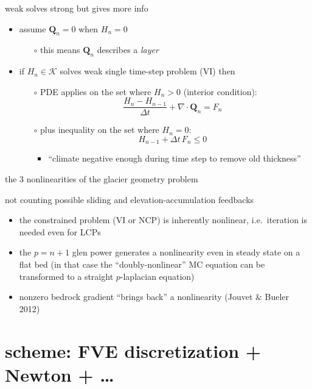 \documentclass{beamer}
\newcommand\bQ{\mathbf{Q}}
\newcommand\Div{\nabla\cdot}
\begin{document}
\begin{frame}{weak solves strong but gives more info}

\begin{itemize}
  \item assume $\bQ_n=0$ when $H_n=0$
    \begin{itemize}
    \item[$\circ$] this means $\bQ_n$ describes a \emph{layer}
    \end{itemize}
  \item if $H_n \in \mathcal{K}$ solves weak single time-step problem (VI) then
  
      \medskip
	  \begin{itemize}
	  \item[$\circ$] PDE applies on the set where $H_n>0$ (interior condition):
	    $$\frac{H_n - H_{n-1}}{\Delta t} + \Div \bQ_n = F_n$$
	  \item[$\circ$] plus inequality on the set where $H_n = 0$:
	    $$H_{n-1} + \Delta t\, F_n \le 0$$
	    \vspace{-6mm}
	    \begin{itemize}
	    \item ``climate negative enough during time step to remove old thickness''
	    \end{itemize}
	  \end{itemize}
\end{itemize}
\end{frame}


\begin{frame}{the 3 nonlinearities of the glacier geometry problem}

not counting possible sliding and elevation-accumulation feedbacks
\begin{itemize}
\item the constrained problem (VI or NCP) is inherently nonlinear, i.e.~iteration is needed even for LCPs
\item the $p=n+1$ glen power generates a nonlinearity even in steady state on a flat bed (in that case the ``doubly-nonlinear'' MC equation can be transformed to a straight $p$-laplacian equation)
\item nonzero bedrock gradient ``brings back'' a nonlinearity (Jouvet \& Bueler 2012)
\end{itemize}
\end{frame}


\section{scheme: FVE discretization + Newton + \dots}
\end{document}

